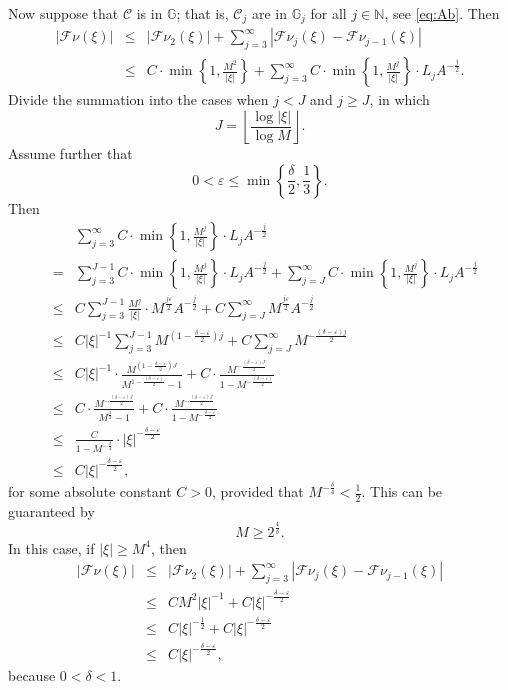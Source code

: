 \documentclass[12pt,reqno]{amsart}
\newcommand\Cc{\mathcal{C}}
\newcommand\Fc{\mathcal{F}}
\newcommand\Gb{\mathbb{G}}
\newcommand\N{\mathbb{N}}
\newcommand\ve{\varepsilon}
\theoremstyle{plain}
\theoremstyle{remark}
\numberwithin{equation}{section}
\begin{document}
Now suppose that $\Cc$ is in $\Gb$; that is, $\Cc_j$ are in $\Gb_j$ for all $j\in\N$, see \eqref{eq:Ab}. Then
\begin{eqnarray*}
|\Fc\nu(\xi)|&\le&\left|\Fc\nu_2(\xi)\right|+\sum_{j=3}^\infty\left|\Fc\nu_j(\xi)-\Fc\nu_{j-1}(\xi)\right|\\
&\le&C\cdot\min\left\{1,\frac{M^2}{|\xi|}\right\}+\sum_{j=3}^\infty C\cdot\min\left\{1,\frac{M^j}{|\xi|}\right\}\cdot L_jA^{-\frac j2}.
\end{eqnarray*}
Divide the summation into the cases when $j<J$ and $j\ge J$, in which
$$J=\left\lfloor\frac{\log|\xi|}{\log M}\right\rfloor.$$
Assume further that 
$$0<\ve\le\min\left\{\frac{\delta}{2},\frac13\right\}.$$
Then
\begin{eqnarray*}
&&\sum_{j=3}^\infty C\cdot\min\left\{1,\frac{M^j}{|\xi|}\right\}\cdot L_jA^{-\frac j2}\\
&=&\sum_{j=3}^{J-1}C\cdot\min\left\{1,\frac{M^j}{|\xi|}\right\}\cdot L_jA^{-\frac j2}+\sum_{j=J}^\infty C\cdot\min\left\{1,\frac{M^j}{|\xi|}\right\}\cdot L_jA^{-\frac j2}\\
&\le&C\sum_{j=3}^{J-1}\frac{M^j}{|\xi|}\cdot M^{\frac{j\ve}{2}}A^{-\frac j2}+C\sum_{j=J}^\infty M^{\frac{j\ve}{2}}A^{-\frac j2}\\
&\le&C|\xi|^{-1}\sum_{j=3}^{J-1}M^{\left(1-\frac{\delta-\ve}{2}\right)j}+C\sum_{j=J}^\infty M^{-\frac{(\delta-\ve)j}{2}}\\
&\le&C|\xi|^{-1}\cdot\frac{M^{\left(1-\frac{\delta-\ve}{2}\right)J}}{M^{1-\frac{(\delta-\ve)}{2}}-1}+C\cdot\frac{M^{-\frac{(\delta-\ve)J}{2}}}{1-M^{-\frac{(\delta-\ve)}{2}}}\\
&\le&C\cdot\frac{M^{-\frac{(\delta-\ve)J}{2}}}{M^{\frac12}-1}+C\cdot\frac{M^{-
\frac{(\delta-\ve)J}{2}}}{1-M^{-\frac{\delta-\ve}{2}}}\\
&\le&\frac{C}{1-M^{-\frac\delta4}}\cdot|\xi|^{-\frac{\delta-\ve}{2}}\\
&\le&C|\xi|^{-\frac{\delta-\ve}{2}},
\end{eqnarray*}
for some absolute constant $C>0$, provided that $M^{-\frac\delta4}<\frac12$. This can be guaranteed by
$$M\ge 2^\frac4\delta.$$
In this case, if $|\xi|\ge M^4$, then
\begin{eqnarray*}
|\Fc\nu(\xi)|&\le&\left|\Fc\nu_2(\xi)\right|+\sum_{j=3}^\infty\left|\Fc\nu_j(\xi)-\Fc\nu_{j-1}(\xi)\right|\\
&\le&CM^2|\xi|^{-1}+C|\xi|^{-\frac{\delta-\ve}{2}}\\
&\le&C|\xi|^{-\frac12}+C|\xi|^{-\frac{\delta-\ve}{2}}\\
&\le&C|\xi|^{-\frac{\delta-\ve}{2}},
\end{eqnarray*}
because $0<\delta<1$.
\end{document}
